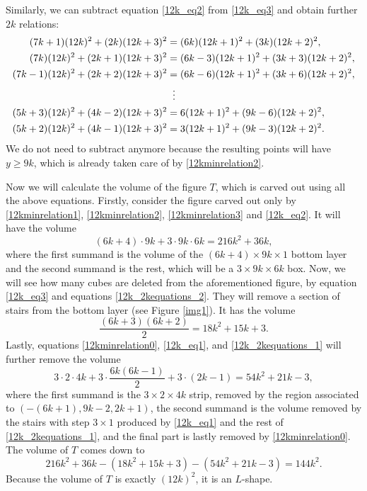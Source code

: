 \documentclass[12pt]{article}
\theoremstyle{remark}
\begin{document}
Similarly, we can subtract equation \eqref{12k_eq2} from \eqref{12k_eq3} and obtain further $2k$ relations:
\begin{equation}\label{12k_2kequations_2}
\begin{aligned} 
(7k+1)(12k)^2 + (2k)(12k+3)^2 &= (6k)(12k+1)^2 + (3k)(12k+2)^2,\\
(7k)(12k)^2 + (2k+1)(12k+3)^2 &= (6k-3)(12k+1)^2 + (3k+3)(12k+2)^2,\\
(7k-1)(12k)^2 + (2k+2)(12k+3)^2 &= (6k-6)(12k+1)^2 + (3k+6)(12k+2)^2,\\
& \hspace{5.6pt} \vdots\\
(5k+3)(12k)^2 + (4k-2)(12k+3)^2 &= 6(12k+1)^2 + (9k-6)(12k+2)^2, \\
(5k+2)(12k)^2 + (4k-1)(12k+3)^2 &= 3(12k+1)^2 + (9k-3)(12k+2)^2. \\
\end{aligned}
\end{equation}
We do not need to subtract anymore because the resulting points will have $y \geq 9k$, which is already taken care of by \eqref{12kminrelation2}.

Now we will calculate the volume of the figure $T$, which is carved out using all the above equations. Firstly, consider the figure carved out only by \eqref{12kminrelation1}, \eqref{12kminrelation2}, \eqref{12kminrelation3} and \eqref{12k_eq2}. It will have the volume
\begin{equation*}\label{12kvol1}
    (6k+4) \cdot 9k   +  3 \cdot 9k \cdot 6k  =  216 k^2 + 36 k,
\end{equation*}
where the first summand is the volume of the $(6k+4) \times 9k \times 1$ bottom layer and the second summand is the rest, which will be a $3 \times 9k \times 6k$ box. Now, we will see how many cubes are deleted from the aforementioned figure, by equation \eqref{12k_eq3} and equations \eqref{12k_2kequations_2}. They will remove a section of stairs from the bottom layer (see Figure \ref{img1}). It has the volume
\begin{equation*}\label{12kvol2}
     \frac{(6k+3)(6k+2)}{2} = 18 k^2 + 15 k + 3.
\end{equation*}
Lastly, equations \eqref{12kminrelation0}, \eqref{12k_eq1}, and \eqref{12k_2kequations_1} will further remove the volume
\begin{equation*}\label{12kvol3}
     3 \cdot 2 \cdot 4k + 3  \cdot \frac{6k(6k-1)}{2} + 3 \cdot (2k-1) = 54 k^2 + 21 k - 3,
\end{equation*}
where the first summand is the $3 \times 2 \times 4k$ strip, removed by the region associated to $(-(6k+1),9k-2,2k+1)$, the second summand is the volume removed by the stairs with step $3 \times 1$ produced by \eqref{12k_eq1} and the rest of \eqref{12k_2kequations_1}, and the final part is lastly removed by \eqref{12kminrelation0}. The volume of $T$ comes down to
\begin{equation*}\label{12kvol4}
     216 k^2 + 36 k - (18 k^2 + 15 k + 3) - ( 54 k^2 + 21 k - 3) = 144k^2.
\end{equation*}
Because the volume of $T$ is exactly $(12k)^2$, it is an $L$-shape.
\end{document}
